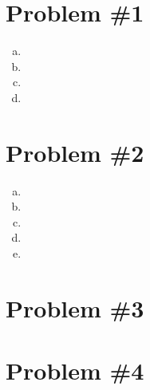 \documentclass[11pt]{article}
\numberwithin{equation}{section}
\begin{document}


\section{Problem \#1}
\begin{enumerate}[(a)]
\item
\item
\item
\item
\end{enumerate}

\section{Problem \#2}
\begin{enumerate}[(a)]
\item
\item
\item
\item
\item
\end{enumerate}

\section{Problem \#3}

\section{Problem \#4}
\end{document}

